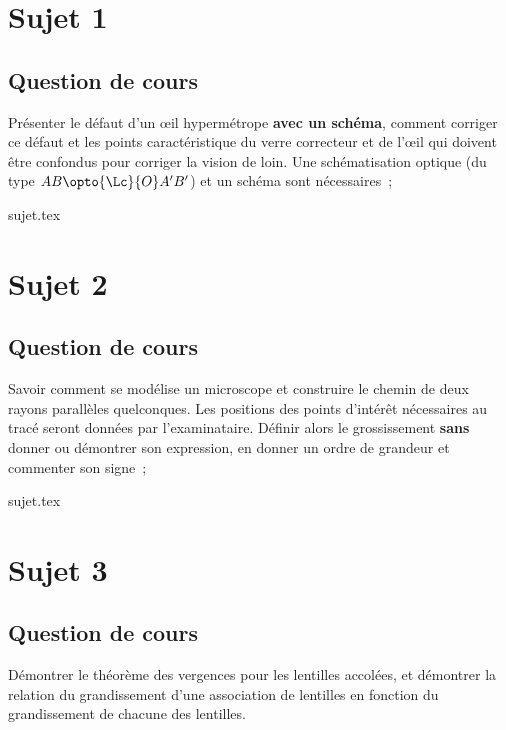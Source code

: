 \documentclass[a4paper, 11pt]{book}
\begin{document}
\resetQ
\newpage

\chapter{Sujet 1}
\section{Question de cours}

Présenter le défaut d'un œil hypermétrope \textbf{avec un schéma}, comment
corriger ce défaut et les points caractéristique du verre correcteur et de l'œil
qui doivent être confondus pour corriger la vision de loin. Une schématisation
optique (du type $AB \opto{\Lc}{O} A'B'$) et un schéma sont nécessaires~;

{sujet.tex}


\resetQ
\newpage

\chapter{Sujet 2}
\section{Question de cours}

Savoir comment se modélise un microscope et construire le chemin de deux rayons
parallèles quelconques. Les positions des points d'intérêt nécessaires au tracé
seront données par l'examinataire. Définir alors le grossissement \textbf{sans}
donner ou démontrer son expression, en donner un ordre de grandeur et commenter
son signe~;

{sujet.tex}


\resetQ
\newpage

\chapter{Sujet 3}
\section{Question de cours}

Démontrer le théorème des vergences pour les lentilles accolées, et démontrer la
relation du grandissement d’une association de lentilles en fonction du
grandissement de chacune des lentilles.
\end{document}
